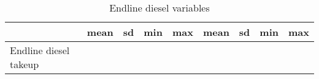 \begin{table}[htbp]\centering
\def\sym#1{\ifmmode^{#1}\else\(^{#1}\)\fi}
\caption{Endline diesel variables\label {tab1}}
\begin{tabular}{l*{2}{cccc}}
\toprule
                    &        mean&          sd&         min&         max&        mean&          sd&         min&         max\\
\midrule
\midrule
Endline diesel takeup&            &            &            &            &            &            &            &            \\
\bottomrule
\end{tabular}
\end{table}
